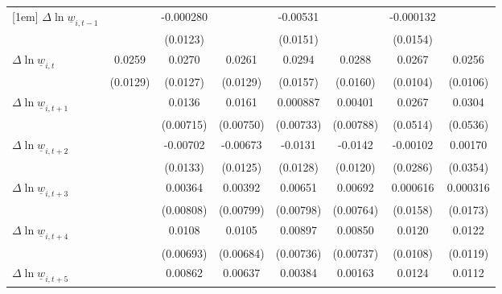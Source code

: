 {\begin{tabular}{l*{7}{c}}
[1em]
$\Delta \ln \underline{w}_{i,t-1}$&                  &-0.000280         &                  & -0.00531         &                  &-0.000132         &                  \\
          &                  & (0.0123)         &                  & (0.0151)         &                  & (0.0154)         &                  \\
[1em]
$\Delta \ln \underline{w}_{i,t}$&   0.0259\sym{*}  &   0.0270\sym{**} &   0.0261\sym{*}  &   0.0294\sym{*}  &   0.0288\sym{*}  &   0.0267\sym{**} &   0.0256\sym{**} \\
          & (0.0129)         & (0.0127)         & (0.0129)         & (0.0157)         & (0.0160)         & (0.0104)         & (0.0106)         \\
[1em]
$\Delta \ln \underline{w}_{i,t+1}$&                  &   0.0136\sym{*}  &   0.0161\sym{**} & 0.000887         &  0.00401         &   0.0267         &   0.0304         \\
          &                  &(0.00715)         &(0.00750)         &(0.00733)         &(0.00788)         & (0.0514)         & (0.0536)         \\
[1em]
$\Delta \ln \underline{w}_{i,t+2}$&                  & -0.00702         & -0.00673         &  -0.0131         &  -0.0142         & -0.00102         &  0.00170         \\
          &                  & (0.0133)         & (0.0125)         & (0.0128)         & (0.0120)         & (0.0286)         & (0.0354)         \\
[1em]
$\Delta \ln \underline{w}_{i,t+3}$&                  &  0.00364         &  0.00392         &  0.00651         &  0.00692         & 0.000616         & 0.000316         \\
          &                  &(0.00808)         &(0.00799)         &(0.00798)         &(0.00764)         & (0.0158)         & (0.0173)         \\
[1em]
$\Delta \ln \underline{w}_{i,t+4}$&                  &   0.0108         &   0.0105         &  0.00897         &  0.00850         &   0.0120         &   0.0122         \\
          &                  &(0.00693)         &(0.00684)         &(0.00736)         &(0.00737)         & (0.0108)         & (0.0119)         \\
[1em]
$\Delta \ln \underline{w}_{i,t+5}$&                  &  0.00862         &  0.00637         &  0.00384         &  0.00163         &   0.0124         &   0.0112         \\

\end{tabular}}
